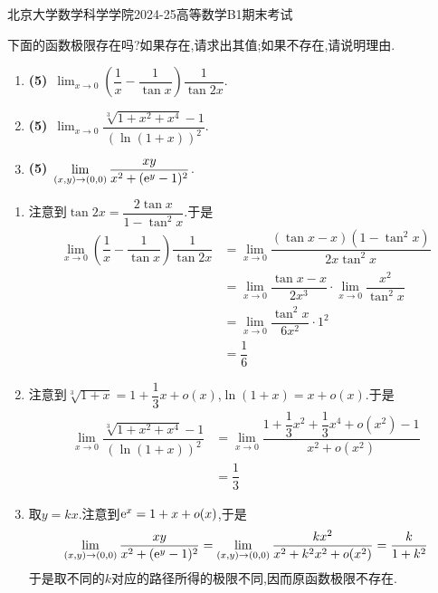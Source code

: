 \documentclass{ctexart}
\begin{document}
\pagestyle{empty}
\begin{center}\Large
    北京大学数学科学学院2024-25高等数学B1期末考试
\end{center}
\begin{problem}[1.(15\songti{分})]
    下面的函数极限存在吗?如果存在,请求出其值;如果不存在,请说明理由.
    \begin{enumerate}[label=\tbf{(\arabic*)}]
        \item \textbf{(5)}\ $\displaystyle\lim_{x\to0}\left(\dfrac{1}{x}-\dfrac{1}{\tan x}\right)\dfrac{1}{\tan2x}$.
        \item \textbf{(5)}\ $\displaystyle\lim_{x\to0}\dfrac{\sqrt[3]{1+x^2+x^4}-1}{\left(\ln(1+x)\right)^2}$.
        \item \textbf{(5)}\ $\displaystyle\lim_{(x,y)\to(0,0)}\dfrac{xy}{x^2+(\mathrm{e}^y-1)^2}$.
    \end{enumerate}
\end{problem}
\begin{solution}
    \begin{enumerate}[label=\tbf{(\arabic*)}]
        \item 注意到$\tan 2x=\dfrac{2\tan x}{1-\tan^2x}$.于是
            \[\begin{aligned}
                \lim_{x\to0}\left(\dfrac{1}{x}-\dfrac{1}{\tan x}\right)\dfrac{1}{\tan2x}
                &= \lim_{x\to0}\dfrac{(\tan x-x)(1-\tan^2x)}{2x\tan^2 x} \\
                &= \lim_{x\to0}\dfrac{\tan x-x}{2x^3}\cdot\lim_{x\to0}\dfrac{x^2}{\tan^2x} \\
                &= \lim_{x\to0}\dfrac{\tan^2x}{6x^2}\cdot1^2\\
                &= \dfrac16
            \end{aligned}\]
        \item 注意到$\sqrt[3]{1+x}=1+\dfrac13x+o(x)$,$\ln(1+x)=x+o(x)$.于是
            \[\begin{aligned}
                \lim_{x\to0}\dfrac{\sqrt[3]{1+x^2+x^4}-1}{\left(\ln(1+x)\right)^2}
                &= \lim_{x\to0}\dfrac{1+\dfrac13x^2+\dfrac13x^4+o(x^2)-1}{x^2+o(x^2)} \\
                &= \dfrac13
            \end{aligned}\]
        \item 取$y=kx$.注意到$\mathrm{e}^x=1+x+o(x)$,于是
            \[\lim_{(x,y)\to(0,0)}\dfrac{xy}{x^2+(\mathrm{e}^y-1)^2}=\lim_{(x,y)\to(0,0)}\dfrac{kx^2}{x^2+k^2x^2+o(x^2)}=\dfrac{k}{1+k^2}\]
            于是取不同的$k$对应的路径所得的极限不同,因而原函数极限不存在.
    \end{enumerate}
\end{solution}
\end{document}
